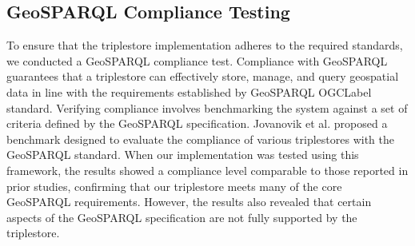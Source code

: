 \subsection{GeoSPARQL Compliance Testing}\label{VI-subsec:compliance-geosparql}

To ensure that the triplestore implementation adheres to the required standards, we conducted a GeoSPARQL compliance test. Compliance with GeoSPARQL guarantees that a triplestore can effectively store, manage, and query geospatial data in line with the requirements established by GeoSPARQL \acrshort{OGCLabel} standard\cite{GeoSPARQLGeographicQuerya}. Verifying compliance involves benchmarking the system against a set of criteria defined by the GeoSPARQL specification. Jovanovik et al. \cite{jovanovikGeoSPARQLComplianceBenchmark2021a} proposed a benchmark designed to evaluate the compliance of various triplestores with the GeoSPARQL standard. When our implementation was tested using this framework, the results showed a compliance level comparable to those reported in prior studies, confirming that our triplestore meets many of the core GeoSPARQL requirements. However, the results also revealed that certain aspects of the GeoSPARQL specification are not fully supported by the triplestore.

\begin{table}[ht]
\centering \caption{Triplestore Feature Comparison}
\label{tab:triplestore-comparison}
\vskip 0.2cm
\end{table}

